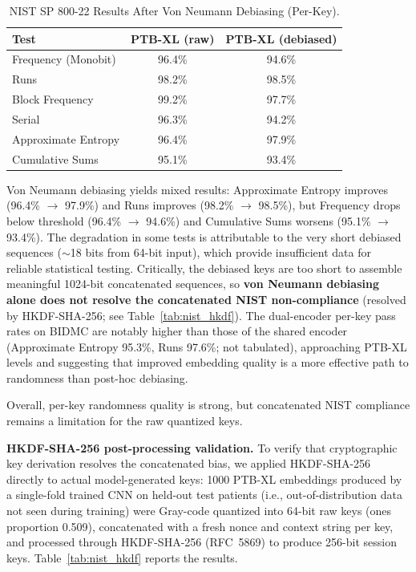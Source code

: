 \documentclass[sensors,article,submit,pdftex,moreauthors]{Definitions/mdpi}
\begin{document}
\begin{table}[H]
\caption{NIST SP 800-22 Results After Von Neumann Debiasing (Per-Key).\label{tab:nist_debiased}}
\begin{tabularx}{\textwidth}{lCC}
\toprule
\textbf{Test} & \textbf{PTB-XL (raw)} & \textbf{PTB-XL (debiased)} \\
\midrule
Frequency (Monobit) & 96.4\% & 94.6\% \\
Runs & 98.2\% & 98.5\% \\
Block Frequency & 99.2\% & 97.7\% \\
Serial & 96.3\% & 94.2\% \\
Approximate Entropy & 96.4\% & 97.9\% \\
Cumulative Sums & 95.1\% & 93.4\% \\
\bottomrule
\end{tabularx}
\end{table}

Von Neumann debiasing yields mixed results: Approximate Entropy improves (96.4\% $\to$ 97.9\%) and Runs improves (98.2\% $\to$ 98.5\%), but Frequency drops below threshold (96.4\% $\to$ 94.6\%) and Cumulative Sums worsens (95.1\% $\to$ 93.4\%). The degradation in some tests is attributable to the very short debiased sequences ($\sim$18 bits from 64-bit input), which provide insufficient data for reliable statistical testing. Critically, the debiased keys are too short to assemble meaningful 1024-bit concatenated sequences, so \textbf{von Neumann debiasing alone does not resolve the concatenated NIST non-compliance} (resolved by HKDF-SHA-256; see Table~\ref{tab:nist_hkdf}). The dual-encoder per-key pass rates on BIDMC are notably higher than those of the shared encoder (Approximate Entropy 95.3\%, Runs 97.6\%; not tabulated), approaching PTB-XL levels and suggesting that improved embedding quality is a more effective path to randomness than post-hoc debiasing.

Overall, per-key randomness quality is strong, but concatenated NIST compliance remains a limitation for the raw quantized keys.

\textbf{HKDF-SHA-256 post-processing validation.} To verify that cryptographic key derivation resolves the concatenated bias, we applied HKDF-SHA-256 directly to actual model-generated keys: 1000 PTB-XL embeddings produced by a single-fold trained CNN on held-out test patients (i.e., out-of-distribution data not seen during training) were Gray-code quantized into 64-bit raw keys (ones proportion 0.509), concatenated with a fresh nonce and context string per key, and processed through HKDF-SHA-256 (RFC~5869) to produce 256-bit session keys. Table~\ref{tab:nist_hkdf} reports the results.
\end{document}
